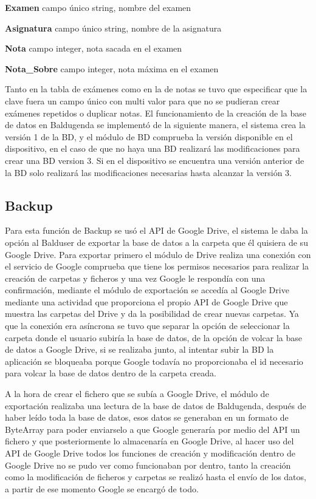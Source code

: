 \textbf{Examen} campo único string, nombre del examen

\textbf{Asignatura} campo único string, nombre de la asignatura

\textbf{Nota} campo integer, nota sacada en el examen

\textbf{Nota\_Sobre} campo integer, nota máxima en el examen


Tanto en la tabla de exámenes como en la de notas se tuvo que especificar que la clave fuera un campo único con multi valor para que no se pudieran crear exámenes repetidos o duplicar notas.
El funcionamiento de la creación de la base de datos en Baldugenda se implementó de la siguiente manera, el sistema crea la versión 1 de la BD, y el módulo de BD comprueba la versión disponible en el dispositivo, en el caso de que no haya una BD realizará las modificaciones para crear una BD version 3. Si en el dispositivo se encuentra una versión anterior de la BD solo realizará las modificaciones necesarias hasta alcanzar la versión 3.


\subsection{Backup}
\label{subsecc:Backup}

Para esta función de Backup se usó el API de Google Drive, el sistema le daba la opción al Balduser de exportar la base de datos a la carpeta que él quisiera de su Google Drive.
Para exportar primero el módulo de Drive realiza una conexión con el servicio de Google comprueba que tiene los permisos necesarios para realizar la creación de carpetas y ficheros y una vez Google le respondía con una confirmación, mediante el módulo de exportación se accedía al Google Drive mediante una actividad que proporciona el propio API de Google Drive que muestra las carpetas del Drive y da la posibilidad de crear nuevas carpetas.
Ya que la conexión era asíncrona se tuvo que separar la opción de seleccionar la carpeta donde el usuario subiría la base de datos, de la opción de volcar la base de datos a Google Drive,  si se realizaba junto, al intentar subir la BD la aplicación se bloqueaba porque Google todavía no proporcionaba el id necesario para volcar la base de datos dentro de la carpeta creada.

A la hora de crear el fichero que se subía a Google Drive, el módulo de exportación realizaba una lectura de la base de datos de Baldugenda, después de haber leído toda la base de datos, esos datos se generaban en un formato de ByteArray para poder enviarselo a que Google generaría por medio del API un fichero y que posteriormente lo almacenaría en Google Drive, al hacer uso del API de Google Drive todos los funciones de creación y modificación dentro de Google Drive no se pudo ver como funcionaban por dentro, tanto la creación como la modificación de ficheros y carpetas se realizó hasta el envío de los datos, a partir de ese momento Google se encargó de todo.

